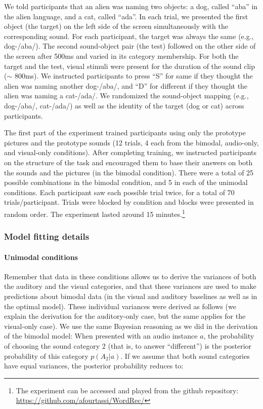 \documentclass[english,floatsintext,man]{apa6}
\theoremstyle{definition}
\theoremstyle{definition}
\theoremstyle{definition}
\theoremstyle{remark}
\begin{document}
We told participants that an alien was naming two objects: a dog, called
\enquote{aba} in the alien language, and a cat, called \enquote{ada}. In
each trial, we presented the first object (the target) on the left side
of the screen simultaneously with the corresponding sound. For each
participant, the target was always the same (e.g., dog-/aba/). The
second sound-object pair (the test) followed on the other side of the
screen after 500ms and varied in its category membership. For both the
target and the test, visual stimuli were present for the duration of the
sound clip (\(\sim\) 800ms). We instructed participants to press
\enquote{S} for same if they thought the alien was naming another
dog-/aba/, and \enquote{D} for different if they thought the alien was
naming a cat-/ada/. We randomized the sound-object mapping (e.g.,
dog-/aba/, cat-/ada/) as well as the identity of the target (dog or cat)
across participants.

The first part of the experiment trained participants using only the
prototype pictures and the prototype sounds (12 trials, 4 each from the
bimodal, audio-only, and visual-only conditions). After completing
training, we instructed participants on the structure of the task and
encouraged them to base their answers on both the sounds and the
pictures (in the bimodal condition). There were a total of 25 possible
combinations in the bimodal condition, and 5 in each of the unimodal
conditions. Each participant saw each possible trial twice, for a total
of 70 trials/participant. Trials were blocked by condition and blocks
were presented in random order. The experiment lasted around 15
minutes.\footnote{The experiment can be accessed and played from the
  github repository: \url{https://github.com/afourtassi/WordRec/}}

\subsubsection{Model fitting details}\label{model-fitting-details}

\paragraph{Unimodal conditions}\label{unimodal-conditions}

Remember that data in these conditions allows us to derive the variances
of both the auditory and the visual categories, and that these variances
are used to make predictions about bimodal data (in the visual and
auditory baselines as well as in the optimal model). These individual
variances were derived as follows (we explain the derivation for the
auditory-only case, but the same applies for the visual-only case). We
use the same Bayesian reasoning as we did in the derivation of the
bimodal model: When presented with an audio instance \(a\), the
probability of choosing the sound category 2 (that is, to answer
\enquote{different}) is the posterior probability of this category
\(p(A_2|a)\). If we assume that both sound categories have equal
variances, the posterior probability reduces to:
\end{document}
